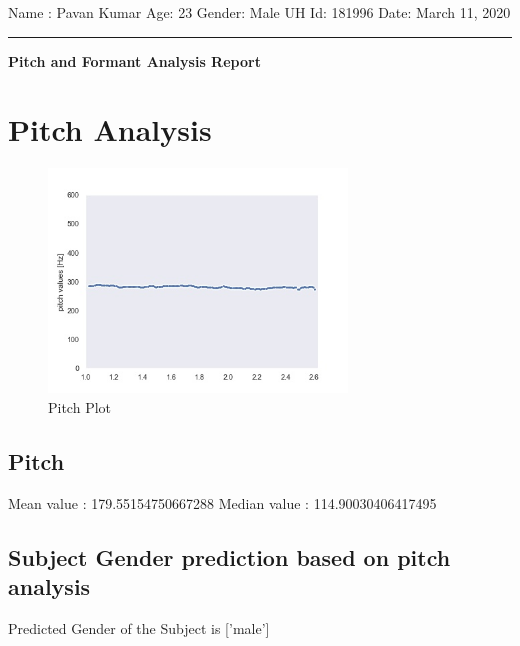 \documentclass{article}%
\begin{document}
%
\normalsize%
\begin{minipage}{\textwidth}%
\flushleft%
Name : Pavan Kumar%
\newline%
Age: 23%
\newline%
Gender: Male%
\newline%
UH Id: 181996%
\newline%
Date: March 11, 2020%
\linebreak%
\noindent\rule{\textwidth}{1pt}%
\newline%
\linebreak%
\begin{minipage}{\textwidth}%
\centering%
\begin{Large}%
\textbf{Pitch and Formant Analysis Report}%
\end{Large}%
\end{minipage}%
\end{minipage}%
\section{Pitch Analysis}%
\label{sec:PitchAnalysis}%


\begin{figure}[h!]%
\centering%
\includegraphics[width=300px]{pitch.jpg}%
\caption{Pitch Plot}%
\end{figure}

%
\subsection{Pitch}%
\label{subsec:Pitch}%
Mean value : 179.55154750667288%
\newline%
Median value : 114.90030406417495

%
\subsection{Subject Gender prediction based on pitch analysis}%
\label{subsec:SubjectGenderpredictionbasedonpitchanalysis}%
Predicted Gender of the Subject is {[}'male'{]}
\end{document}
